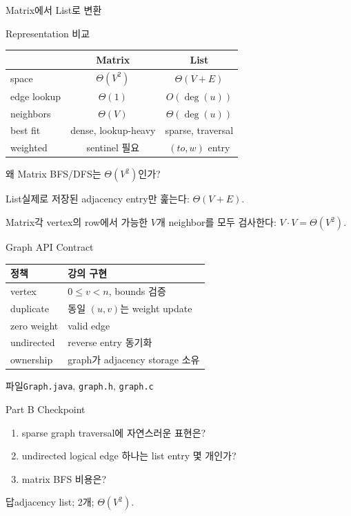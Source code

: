 \begin{frame}{Matrix에서 List로 변환}
\centering{}
\end{frame}
\begin{frame}{Representation 비교}
\small\centering\begin{tabular}{lcc}\toprule&Matrix&List\\\midrule
space&$\Theta(V^2)$&$\Theta(V+E)$\\edge lookup&$\Theta(1)$&$O(\deg(u))$\\neighbors&$\Theta(V)$&$\Theta(\deg(u))$\\best fit&dense, lookup-heavy&sparse, traversal\\weighted&sentinel 필요&\((to,w)\) entry\\\bottomrule\end{tabular}
\end{frame}
\begin{frame}{왜 Matrix BFS/DFS는 \(\Theta(V^2)\)인가?}
\begin{block}{List}실제로 저장된 adjacency entry만 훑는다: \(\Theta(V+E)\).\end{block}
\begin{block}{Matrix}각 vertex의 row에서 가능한 \(V\)개 neighbor를 모두 검사한다: \(V\cdot V=\Theta(V^2)\).\end{block}
\end{frame}
\begin{frame}{Graph API Contract}
\small\begin{tabular}{ll}\toprule
정책&강의 구현\\\midrule
vertex&\(0\le v<n\), bounds 검증\\
duplicate&동일 \((u,v)\)는 weight update\\
zero weight&valid edge\\
undirected&reverse entry 동기화\\
ownership&graph가 adjacency storage 소유\\\bottomrule
\end{tabular}
\begin{exampleblock}{파일}\texttt{Graph.java}, \texttt{graph.h}, \texttt{graph.c}\end{exampleblock}
\end{frame}
\begin{frame}{Part B Checkpoint}
\begin{enumerate}\item sparse graph traversal에 자연스러운 표현은?\item undirected logical edge 하나는 list entry 몇 개인가?\item matrix BFS 비용은?\end{enumerate}
\begin{exampleblock}{답}adjacency list; 2개; \(\Theta(V^2)\).\end{exampleblock}
\end{frame}
